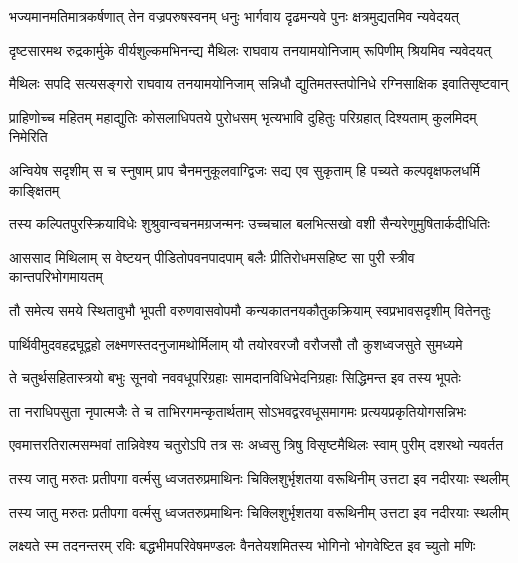 \fourlineindentedshloka
{भज्यमानमतिमात्रकर्षणात्}
{तेन वज्रपरुषस्वनम् धनुः}
{भार्गवाय दृढमन्यवे पुनः}
{क्षत्रमुद्यतमिव न्यवेदयत्} %

\fourlineindentedshloka
{दृष्टसारमथ रुद्रकार्मुके}
{वीर्यशुल्कमभिनन्द्य मैथिलः}
{राघवाय तनयामयोनिजाम्}
{रूपिणीम् श्रियमिव न्यवेदयत्} %

\fourlineindentedshloka
{मैथिलः सपदि सत्यसङ्गरो}
{राघवाय तनयामयोनिजाम्}
{सन्निधौ द्युतिमतस्तपोनिधे}
{रग्निसाक्षिक इवातिसृष्टवान्} %

\fourlineindentedshloka
{प्राहिणोच्च महितम् महाद्युतिः}
{कोसलाधिपतये पुरोधसम्}
{भृत्यभावि दुहितुः परिग्रहात्}
{दिश्यताम् कुलमिदम् निमेरिति} %

\fourlineindentedshloka
{अन्वियेष सदृशीम् स च स्नुषाम्}
{प्राप चैनमनुकूलवाग्द्विजः}
{सद्य एव सुकृताम् हि पच्यते}
{कल्पवृक्षफलधर्मि काङ्क्षितम्} %

\fourlineindentedshloka
{तस्य कल्पितपुरस्क्रियाविधेः}
{शुश्रुवान्वचनमग्रजन्मनः}
{उच्चचाल बलभित्सखो वशी}
{सैन्यरेणुमुषितार्कदीधितिः} %

\fourlineindentedshloka
{आससाद मिथिलाम् स वेष्टयन्}
{पीडितोपवनपादपाम् बलैः}
{प्रीतिरोधमसहिष्ट सा पुरी}
{स्त्रीव कान्तपरिभोगमायतम्} %

\fourlineindentedshloka
{तौ समेत्य समये स्थितावुभौ}
{भूपती वरुणवासवोपमौ}
{कन्यकातनयकौतुकक्रियाम्}
{स्वप्रभावसदृशीम् वितेनतुः} %

\fourlineindentedshloka
{पार्थिवीमुदवहद्रघूद्वहो}
{लक्ष्मणस्तदनुजामथोर्मिलाम्}
{यौ तयोरवरजौ वरौजसौ}
{तौ कुशध्वजसुते सुमध्यमे} %

\fourlineindentedshloka
{ते चतुर्थसहितास्त्रयो बभुः}
{सूनवो नववधूपरिग्रहाः}
{सामदानविधिभेदनिग्रहाः}
{सिद्धिमन्त इव तस्य भूपतेः} %

\fourlineindentedshloka
{ता नराधिपसुता नृपात्मजैः}
{ते च ताभिरगमन्कृतार्थताम्}
{सोऽभवद्वरवधूसमागमः}
{प्रत्ययप्रकृतियोगसन्निभः} %

\fourlineindentedshloka
{एवमात्तरतिरात्मसम्भवां}
{तान्निवेश्य चतुरोऽपि तत्र सः}
{अध्वसु त्रिषु विसृष्टमैथिलः}
{स्वाम् पुरीम् दशरथो न्यवर्तत} %

\fourlineindentedshloka
{तस्य जातु मरुतः प्रतीपगा}
{वर्त्मसु ध्वजतरुप्रमाथिनः}
{चिक्लिशुर्भृशतया वरूथिनीम्}
{उत्तटा इव नदीरयाः स्थलीम्} %

\fourlineindentedshloka
{तस्य जातु मरुतः प्रतीपगा}
{वर्त्मसु ध्वजतरुप्रमाथिनः}
{चिक्लिशुर्भृशतया वरूथिनीम्}
{उत्तटा इव नदीरयाः स्थलीम्} %

\fourlineindentedshloka
{लक्ष्यते स्म तदनन्तरम् रविः}
{बद्धभीमपरिवेषमण्डलः}
{वैनतेयशमितस्य भोगिनो}
{भोगवेष्टित इव च्युतो मणिः} %

